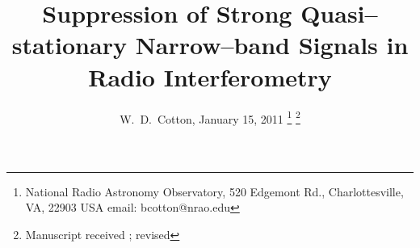\documentclass[journal]{IEEEtran}
\begin{document}
%
\title{Suppression of Strong Quasi--stationary Narrow--band Signals in Radio
  Interferometry}
%
%
%


\author{W.~D.~Cotton, January 15, 2011%
\thanks{National Radio Astronomy Observatory, 520 Edgemont Rd.,
Charlottesville, VA, 22903 USA email: bcotton@nrao.edu}%
\thanks{Manuscript received ; revised }}

% 
%
\end{document}
